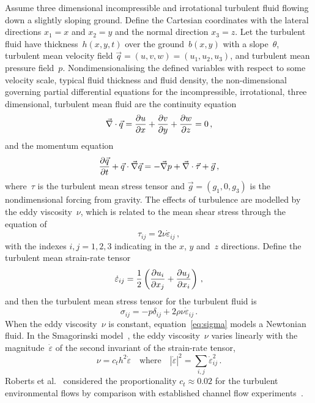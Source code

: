 \documentclass[a5paper,12pt]{article}
\newcommand{\ros}{{\dot\varepsilon}}
\begin{document}
Assume three dimensional incompressible and irrotational turbulent fluid flowing down a slightly sloping ground. 
Define the Cartesian coordinates with the lateral directions $x_1=x$ and $x_2=y$ and the normal direction $x_3=z$. 
Let the turbulent fluid have thickness~$h(x,y,t)$ over the ground~$b(x,y)$ with a slope~$\theta$, turbulent mean velocity field $\vec q=(u,v,w)=(u_1,u_2,u_3)$, and turbulent mean pressure field~$p$.
Nondimensionalising the defined variables with respect to some velocity scale, typical fluid thickness and fluid density, the non-dimensional governing partial differential equations for the incompressible, irrotational, three dimensional, turbulent mean fluid are the continuity equation
\begin{equation}
    \divv\vec q=\D xu+\D yv+\D zw=0\,,\label{eq:cont}
\end{equation}
and the momentum equation
\begin{equation}
    \D t{\vec q} +\vec q\cdot\grad\vec q
    =-\grad p +\divv\vec\tau +\vec{g}\,,\label{eq:mom}
\end{equation}
where~$\tau$ is the turbulent mean stress tensor and $\vec g=(g_1,0,g_3)$ is the nondimensional forcing from gravity.
The effects of turbulence are modelled by the eddy viscosity~$\nu$, which is related to the mean shear stress through the equation of
\begin{equation}
\tau_{ij}=2\nu\ros_{ij}\,,\label{eq:tau}
\end{equation}
with the indexes $i,j=1,2,3$ indicating in the $x$, $y$ and~$z$ directions.
Define the turbulent mean strain-rate tensor~\cite[e.g.]{Roberts2008,Georgiev2008}
\begin{equation}
	\ros_{ij} =\frac12\left( \D{x_j}{u_i} +\D{x_i}{u_j}\right) \,,\label{eq:strainrate}
\end{equation}
and then the turbulent mean stress tensor for the turbulent fluid is
\begin{equation}
\sigma_{ij}=-p\delta_{ij}+2\rho\nu\ros_{ij}\,.\label{eq:sigma}
\end{equation}
When the eddy viscosity~$\nu$ is constant, equation~\eqref{eq:sigma} models a Newtonian fluid.
In the Smagorinski model~\cite[e.g.]{Ozgokmen2007a}, the eddy viscosity~$\nu$ varies linearly with the magnitude~$\ros$ of the second invariant of the strain-rate tensor,
\begin{equation}
  \nu=c_th^2\ros\quad\text{where}\quad |\ros|^2=\sum_{i,j}\ros_{ij}^2\,.\label{eq:nu}
\end{equation}
Roberts et al.~\cite{Roberts2008} considered the proportionality $c_t\approx0.02$ for the turbulent environmental flows by comparison with established channel flow experiments~\cite[e.g.]{Nezu2005}.
\end{document}
